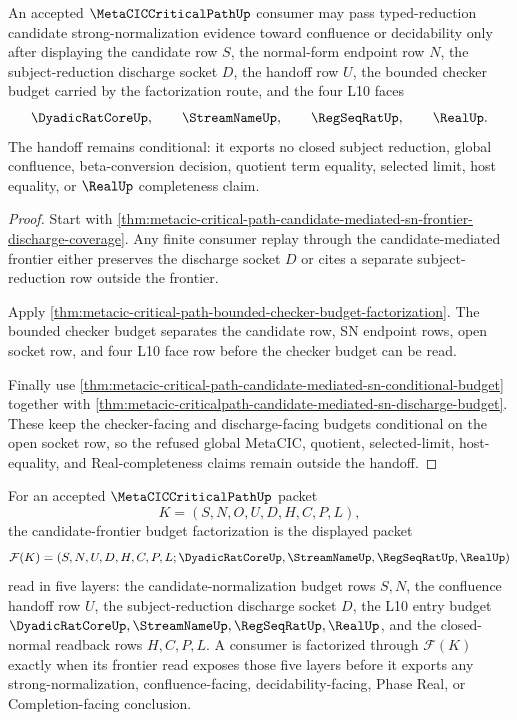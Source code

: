 \begin{theorem}
\label{thm:metacic-typed-reduction-candidate-sn-handoff}
An accepted $\MetaCICCriticalPathUp$ consumer may pass typed-reduction candidate strong-normalization evidence toward confluence or decidability only after displaying the candidate row $S$, the normal-form endpoint row $N$, the subject-reduction discharge socket $D$, the handoff row $U$, the bounded checker budget carried by the factorization route, and the four L10 faces
$$
\DyadicRatCoreUp,\qquad
\StreamNameUp,\qquad
\RegSeqRatUp,\qquad
\RealUp .
$$
The handoff remains conditional: it exports no closed subject reduction, global confluence, beta-conversion decision, quotient term equality, selected limit, host equality, or $\RealUp$ completeness claim.
\end{theorem}
\begin{proof}
Start with \autoref{thm:metacic-critical-path-candidate-mediated-sn-frontier-discharge-coverage}. Any finite consumer replay through the candidate-mediated frontier either preserves the discharge socket $D$ or cites a separate subject-reduction row outside the frontier.

Apply \autoref{thm:metacic-critical-path-bounded-checker-budget-factorization}. The bounded checker budget separates the candidate row, SN endpoint rows, open socket row, and four L10 face row before the checker budget can be read.

Finally use \autoref{thm:metacic-critical-path-candidate-mediated-sn-conditional-budget} together with \autoref{thm:metacic-criticalpath-candidate-mediated-sn-discharge-budget}. These keep the checker-facing and discharge-facing budgets conditional on the open socket row, so the refused global MetaCIC, quotient, selected-limit, host-equality, and Real-completeness claims remain outside the handoff.
\end{proof}

\begin{definition}
\label{def:metacic-critical-path-frontier-budget-factorization}
For an accepted $\MetaCICCriticalPathUp$ packet
$$
K=(S,N,O,U,D,H,C,P,L),
$$
the candidate-frontier budget factorization is the displayed packet
$$
\mathcal{F}(K)=
(S,N,U,D,H,C,P,L;\DyadicRatCoreUp,\StreamNameUp,\RegSeqRatUp,\RealUp)
$$
read in five layers: the candidate-normalization budget rows $S,N$, the confluence handoff row $U$, the subject-reduction discharge socket $D$, the L10 entry budget $\DyadicRatCoreUp,\StreamNameUp,\RegSeqRatUp,\RealUp$, and the closed-normal readback rows $H,C,P,L$. A consumer is factorized through $\mathcal{F}(K)$ exactly when its frontier read exposes those five layers before it exports any strong-normalization, confluence-facing, decidability-facing, Phase Real, or Completion-facing conclusion.
\end{definition}


